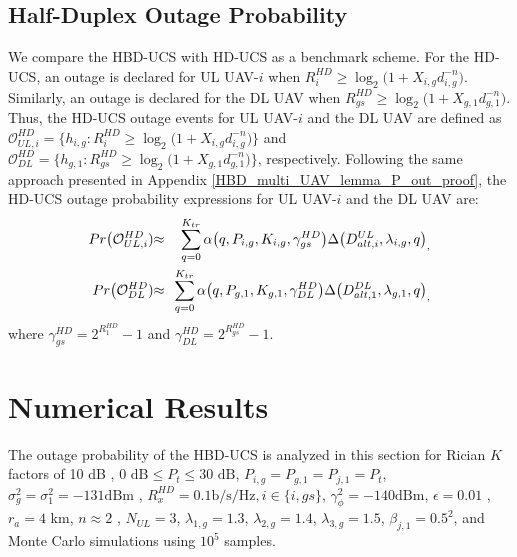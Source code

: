 \subsection{Half-Duplex Outage Probability}
We compare the HBD-UCS with HD-UCS as a benchmark scheme. For the HD-UCS, an outage is declared for UL UAV-$i$ when $R_{i}^{HD} \geq \log_{2}\big(1 + X_{i,g}d_{i,g}^{-n}\big)$. Similarly, an outage is declared for the DL UAV when $R_{gs}^{HD} \geq \log_{2}\big(1 + X_{g,1}d_{g,1}^{-n}\big)$. Thus, the HD-UCS outage events for UL UAV-$i$ and the DL UAV are defined as $\mathcal{O}_{UL,i}^{HD} = \big\{ h_{i,g} : R_{i}^{HD} \geq \log_{2}\big(1 + X_{i,g}d_{i,g}^{-n}\big)\big\}$ and $\mathcal{O}_{DL}^{HD} = \Big\{ h_{g,1} : R_{gs}^{HD} \geq \log_{2}\Big(1 + X_{g,1}d_{g,1}^{-n}\Big)\Big\}$, respectively. Following the same approach presented in Appendix \ref{HBD_multi_UAV_lemma_P_out_proof}, the HD-UCS outage probability expressions for UL UAV-$i$ and the DL UAV are:
\begin{eqnarray}
 Pr\big(\mathcal{O}_{UL,i}^{HD}) & \hspace{-0.1cm} \approx & \hspace{-0.1cm} \sum_{q=0}^{K_{tr}} \alpha\big(q,P_{i,g},K_{i,g},\gamma_{gs}^{HD}\big) \Delta\big(D_{alt,i}^{UL},\lambda_{i,g},q\big)_, \\
 Pr\big(\mathcal{O}_{DL}^{HD}) & \hspace{-0.1cm} \approx & \hspace{-0.1cm} \sum_{q=0}^{K_{tr}} \alpha\big(q,P_{g,1},K_{g,1},\gamma_{DL}^{HD}\big) \Delta\big(D_{alt,1}^{DL},\lambda_{g,1},q\big)_,
\end{eqnarray}
where $\gamma_{gs}^{HD} = 2^{R_{1}^{HD}}-1$ and $\gamma_{DL}^{HD} = 2^{R_{gs}^{HD}}-1$.

\section{Numerical Results} \label{HBD_multi_UAV_sec_num_res}

The outage probability of the HBD-UCS is analyzed in this section for Rician $K$ factors of 10 dB \cite[Table V]{matolak2017air_suburban}, $0\text{ dB} \leq P_t \leq 30\text{ dB}$, $P_{i,g} = P_{g,1} = P_{j,1} = P_t$, $\sigma_g^2 = \sigma_{1}^2 = -131\text{dBm}$ \cite{itu2011m2233}, $R_{x}^{HD} =  0.1 \text{b/s/Hz}, i \in \{i,gs\}$, $\gamma_{\phi}^2 = -140\text{dBm}$, $\epsilon=0.01$ \cite{ernest2019outage}, $r_a=4$ km, $n \approx 2$ \cite[Table III]{matolak2017air_suburban}, $N_{UL}=3$, $\lambda_{1,g} =1.3$, $\lambda_{2,g} =1.4$, $\lambda_{3,g} =1.5$, $\beta_{j,1}=0.5^2$, and Monte Carlo simulations using $10^{5}$ samples.

